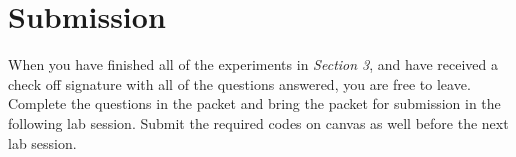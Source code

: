 \documentclass[12pt]{article}
\begin{document}
\checkoffsubsub 

\section{Submission}

When you have finished all of the experiments in \textit{Section 3}, and have received a check off signature with all of the questions answered, you are free to leave. Complete the questions in the packet and bring the packet for submission in the following lab session. Submit the required codes on canvas as well before the next lab session.
\end{document}
